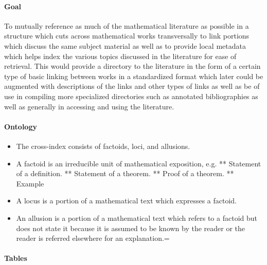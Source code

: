 \paragraph{Goal} To mutually reference as much of the mathematical literature as
possible in a structure which cuts across mathematical works
transversally to link portions which discuss the same subject material
as well as to provide local metadata which helps index the various
topics discussed in the literature for ease of retrieval. This would
provide a directory to the literature in the form of a certain type of
basic linking between works in a standardized format which later could
be augmented with descriptions of the links and other types of links as
well as be of use in compiling more specialized directories such as
annotated bibliographies as well as generally in accessing and using the
literature.

\paragraph{Ontology}

\begin{itemize}
\item
  The cross-index consists of factoids, loci, and allusions.
\item
  A factoid is an irreducible unit of mathematical exposition, e.g. **
  Statement of a definition. ** Statement of a theorem. ** Proof of a
  theorem. ** Example
\item
  A locus is a portion of a mathematical text which expresses a factoid.
\item
  An allusion is a portion of a mathematical text which refers to a
  factoid but does not state it because it is assumed to be known by the
  reader or the reader is referred elsewhere for an explanation.=
\end{itemize}

\paragraph{Tables}

